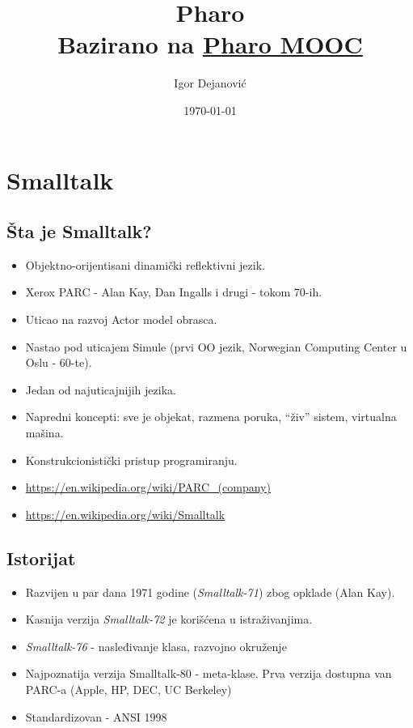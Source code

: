 \documentclass[presentation]{beamer}
\author{Igor Dejanović}
\date{\today}
\title{Pharo\\\medskip
\large Bazirano na \href{http://mooc.pharo.org}{Pharo MOOC}}
\begin{document}
\maketitle

\section{Smalltalk}
\label{sec:orgb429961}
\subsection{Šta je Smalltalk?}
\label{sec:org78e2acd}
\begin{itemize}
\item Objektno-orijentisani dinamički reflektivni jezik.
\item Xerox PARC - Alan Kay, Dan Ingalls i drugi - tokom 70-ih.
\item Uticao na razvoj Actor model obrasca.
\item Nastao pod uticajem Simule (prvi OO jezik, Norwegian Computing Center u Oslu -
60-te).
\item Jedan od najuticajnijih jezika.
\item Napredni koncepti: sve je objekat, razmena poruka, ``živ'' sistem, virtualna
mašina.
\item Konstrukcionistički pristup programiranju.
\end{itemize}

\begin{itemize}
\item \url{https://en.wikipedia.org/wiki/PARC\_(company)}
\item \url{https://en.wikipedia.org/wiki/Smalltalk}
\end{itemize}

\subsection{Istorijat}
\label{sec:orge0fb4ae}
\begin{itemize}
\item Razvijen u par dana 1971 godine (\emph{Smalltalk-71}) zbog opklade (Alan Kay).
\item Kasnija verzija \emph{Smalltalk-72} je korišćena u istraživanjima.
\item \emph{Smalltalk-76} - nasleđivanje klasa, razvojno okruženje
\item Najpoznatija verzija Smalltalk-80 - meta-klase. Prva verzija dostupna van
PARC-a (Apple, HP, DEC, UC Berkeley)
\item Standardizovan - ANSI 1998
\end{itemize}
\end{document}
